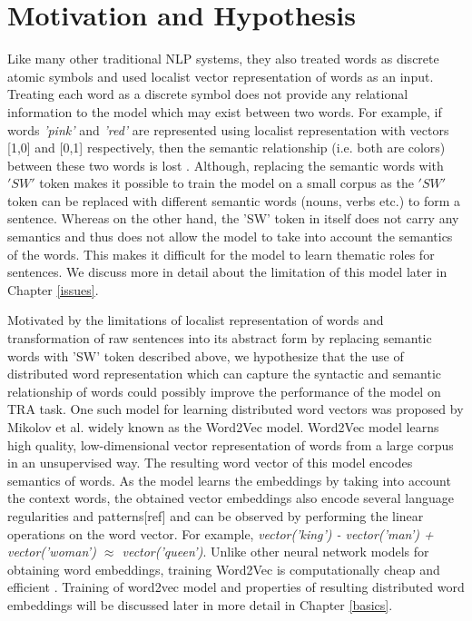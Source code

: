 \section{Motivation and Hypothesis}

Like many other traditional NLP systems, they also treated words as discrete atomic symbols and used localist vector representation of words as an input. Treating each word as a discrete symbol does not provide any relational information to the model which may exist between two words. For example, if words \textit{'pink'} and \textit{'red'} are represented using localist representation with vectors [1,0] and [0,1] respectively, then the semantic relationship (i.e. both are colors) between these two words is lost \cite{w2v:tensor_flow}. Although, replacing the semantic words with $'SW'$ token makes it possible to train the model on a small corpus as the $'SW'$ token can be replaced with different semantic words (nouns, verbs etc.) to form a sentence. Whereas on the other hand, the 'SW' token in itself does not carry any semantics and thus does not allow the model to take into account the semantics of the words. This makes it difficult for the model to learn thematic roles for sentences. We discuss more in detail about the limitation of this model later in Chapter \ref{issues}.

Motivated by the limitations of localist representation of words and transformation of raw sentences into its abstract form by replacing semantic words with 'SW' token described above, we hypothesize that the use of distributed word representation which can capture the syntactic and semantic relationship of words could possibly improve the performance of the model on TRA task. One such model for learning distributed word vectors was proposed by Mikolov et al. \cite{w2v:mikolov_2013_distributed} widely known as the Word2Vec model. Word2Vec model learns high quality, low-dimensional vector representation of words from a large corpus in an unsupervised way. The resulting word vector of this model encodes semantics of words. As the model learns the embeddings by taking into account the context words, the obtained vector embeddings also encode several language regularities and patterns[ref] and can be observed by performing the linear operations on the word vector. For example, \textit{vector('king') - vector('man') + vector('woman') $\approx$ vector('queen')}. Unlike other neural network models for obtaining word embeddings, training Word2Vec is computationally cheap and efficient \cite{w2v:mikolov_2013_distributed}. Training of word2vec model and properties of resulting distributed word embeddings will be discussed later in more detail in Chapter \ref{basics}.  

